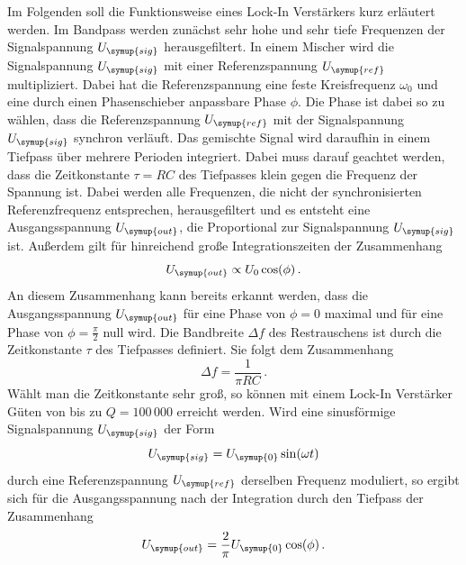 Im Folgenden soll die Funktionsweise eines Lock-In Verstärkers kurz erläutert
werden. Im Bandpass werden zunächst sehr hohe und sehr tiefe Frequenzen der
Signalspannung $U_{\symup{sig}}$ herausgefiltert. In einem Mischer wird die
Signalspannung $U_{\symup{sig}}$ mit einer Referenzspannung $U_{\symup{ref}}$
multipliziert. Dabei hat die Referenzspannung eine feste Kreisfrequenz
$\omega_0$ und eine durch einen Phasenschieber anpassbare Phase $\phi$. Die Phase
ist dabei so zu wählen, dass die Referenzspannung $U_{\symup{ref}}$ mit der
Signalspannung $U_{\symup{sig}}$ synchron verläuft. Das gemischte Signal wird
daraufhin in einem Tiefpass über mehrere Perioden integriert. Dabei muss darauf
geachtet werden, dass  die Zeitkonstante $\tau=RC$ des Tiefpasses klein gegen die
Frequenz der Spannung ist. Dabei werden alle Frequenzen, die nicht
der synchronisierten Referenzfrequenz entsprechen, herausgefiltert und es entsteht
eine Ausgangsspannung $U_{\symup{out}}$, die Proportional zur Signalspannung
$U_{\symup{sig}}$ ist. Außerdem gilt für hinreichend große Integrationszeiten
der Zusammenhang
\begin{equation}
  U_{\symup{out}}\propto U_0 \cos(\phi) \,.
  \label{eqn:U_out_prop}
\end{equation}
An diesem Zusammenhang kann bereits erkannt werden, dass die Ausgangsspannung
$U_{\symup{out}}$ für eine Phase von $\phi=0$ maximal und für eine Phase von
$\phi=\frac{\pi}{2}$ null wird.
Die Bandbreite $\Delta f$ des Restrauschens ist durch die Zeitkonstante $\tau$ des Tiefpasses
definiert. Sie folgt dem Zusammenhang
\begin{equation}
  \Delta f=\frac{1}{\pi R C} \,.
  \label{eqn:bandbreite}
\end{equation}
Wählt man die Zeitkonstante sehr groß, so können mit einem Lock-In Verstärker Güten
von bis zu $Q=100 \, 000$ erreicht werden.
Wird eine sinusförmige Signalspannung $U_{\symup{sig}}$ der Form
\begin{equation}
  U_{\symup{sig}}=U_{\symup{0}}\sin(\omega t)
\end{equation}
durch eine Referenzspannung $U_{\symup{ref}}$ derselben Frequenz moduliert, so
ergibt sich für die Ausgangsspannung nach der Integration durch den Tiefpass
der Zusammenhang
\begin{equation}
  U_{\symup{out}}=\frac{2}{\pi}U_{\symup{0}}\cos(\phi)\,.
\end{equation}
